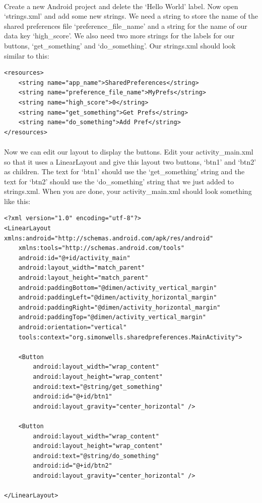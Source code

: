 \paragraph{} Create a new Android project and delete the `Hello World' label. Now open `strings.xml' and add some new strings. We need a string to store the name of the shared preferences file `preference\_file\_name' and a string for the name of our data key `high\_score'. We also need two more strings for the labels for our buttons, `get\_something' and `do\_something'. Our strings.xml should look similar to this:

\begin{lstlisting}
<resources>
    <string name="app_name">SharedPreferences</string>
    <string name="preference_file_name">MyPrefs</string>
    <string name="high_score">0</string>
    <string name="get_something">Get Prefs</string>
    <string name="do_something">Add Pref</string>
</resources>
\end{lstlisting}

\paragraph{} Now we can edit our layout to display the buttons. Edit your activity\_main.xml so that it uses a LinearLayout and give this layout two buttons, `btn1' and `btn2' as children. The text for `btn1' should use the `get\_something' string and the text for `btn2' should use the `do\_something' string that we just added to strings.xml. When you are done, your activity\_main.xml should look something like this:

\begin{lstlisting}
<?xml version="1.0" encoding="utf-8"?>
<LinearLayout xmlns:android="http://schemas.android.com/apk/res/android"
    xmlns:tools="http://schemas.android.com/tools"
    android:id="@+id/activity_main"
    android:layout_width="match_parent"
    android:layout_height="match_parent"
    android:paddingBottom="@dimen/activity_vertical_margin"
    android:paddingLeft="@dimen/activity_horizontal_margin"
    android:paddingRight="@dimen/activity_horizontal_margin"
    android:paddingTop="@dimen/activity_vertical_margin"
    android:orientation="vertical"
    tools:context="org.simonwells.sharedpreferences.MainActivity">

    <Button
        android:layout_width="wrap_content"
        android:layout_height="wrap_content"
        android:text="@string/get_something"
        android:id="@+id/btn1"
        android:layout_gravity="center_horizontal" />

    <Button
        android:layout_width="wrap_content"
        android:layout_height="wrap_content"
        android:text="@string/do_something"
        android:id="@+id/btn2"
        android:layout_gravity="center_horizontal" />

</LinearLayout>
\end{lstlisting}


